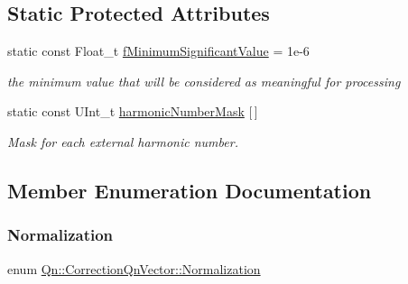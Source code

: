 \subsection*{Static Protected Attributes}
\begin{DoxyCompactItemize}
\item 
\mbox{\label{classQn_1_1CorrectionQnVector_ae6b54b512ea4942bbed53cb012980035}} 
static const Float\+\_\+t \mbox{\hyperlink{classQn_1_1CorrectionQnVector_ae6b54b512ea4942bbed53cb012980035}{f\+Minimum\+Significant\+Value}} = 1e-\/6
\begin{DoxyCompactList}\small\item\em the minimum value that will be considered as meaningful for processing \end{DoxyCompactList}\item 
static const U\+Int\+\_\+t \mbox{\hyperlink{classQn_1_1CorrectionQnVector_a4dd6b60f412516d586b204f63350ab5d}{harmonic\+Number\+Mask}} \mbox{[}$\,$\mbox{]}
\begin{DoxyCompactList}\small\item\em Mask for each external harmonic number. \end{DoxyCompactList}\end{DoxyCompactItemize}


\subsection{Member Enumeration Documentation}
\mbox{\label{classQn_1_1CorrectionQnVector_a2998fe4babb716c57848c8c73b24a398}} 
\subsubsection{\texorpdfstring{Normalization}{Normalization}}
{\footnotesize\ttfamily enum \mbox{\hyperlink{classQn_1_1CorrectionQnVector_a2998fe4babb716c57848c8c73b24a398}{Qn\+::\+Correction\+Qn\+Vector\+::\+Normalization}}\hspace{0.3cm}{\ttfamily [strong]}}

